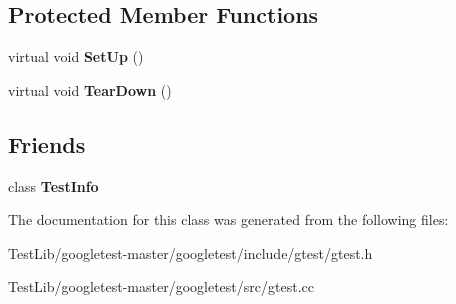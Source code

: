 \subsection*{Protected Member Functions}
\begin{DoxyCompactItemize}
\item 
\mbox{\label{classtesting_1_1Test_a190315150c303ddf801313fd1a777733}} 
virtual void {\bfseries Set\+Up} ()
\item 
\mbox{\label{classtesting_1_1Test_a5f0ab439802cbe0ef7552f1a9f791923}} 
virtual void {\bfseries Tear\+Down} ()
\end{DoxyCompactItemize}
\subsection*{Friends}
\begin{DoxyCompactItemize}
\item 
\mbox{\label{classtesting_1_1Test_a4c49c2cdb6c328e6b709b4542f23de3c}} 
class {\bfseries Test\+Info}
\end{DoxyCompactItemize}


The documentation for this class was generated from the following files\+:\begin{DoxyCompactItemize}
\item 
Test\+Lib/googletest-\/master/googletest/include/gtest/gtest.\+h\item 
Test\+Lib/googletest-\/master/googletest/src/gtest.\+cc\end{DoxyCompactItemize}

